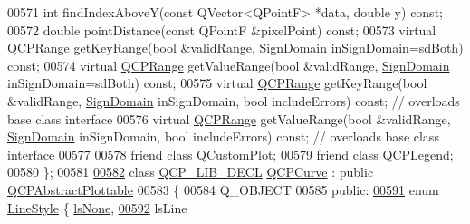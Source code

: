\begin{DoxyCode}
00571   \textcolor{keywordtype}{int} findIndexAboveY(\textcolor{keyword}{const} QVector<QPointF> *data, \textcolor{keywordtype}{double} y) \textcolor{keyword}{const};
00572   \textcolor{keywordtype}{double} pointDistance(\textcolor{keyword}{const} QPointF &pixelPoint) \textcolor{keyword}{const};
00573   \textcolor{keyword}{virtual} \hyperlink{a00049}{QCPRange} getKeyRange(\textcolor{keywordtype}{bool} &validRange, \hyperlink{a00024_a661743478a1d3c09d28ec2711d7653d8}{SignDomain} inSignDomain=sdBoth) \textcolor{keyword}{const};
00574   \textcolor{keyword}{virtual} \hyperlink{a00049}{QCPRange} getValueRange(\textcolor{keywordtype}{bool} &validRange, \hyperlink{a00024_a661743478a1d3c09d28ec2711d7653d8}{SignDomain} inSignDomain=sdBoth) \textcolor{keyword}{const};
00575   \textcolor{keyword}{virtual} \hyperlink{a00049}{QCPRange} getKeyRange(\textcolor{keywordtype}{bool} &validRange, \hyperlink{a00024_a661743478a1d3c09d28ec2711d7653d8}{SignDomain} inSignDomain, \textcolor{keywordtype}{bool} 
      includeErrors) \textcolor{keyword}{const}; \textcolor{comment}{// overloads base class interface}
00576   \textcolor{keyword}{virtual} \hyperlink{a00049}{QCPRange} getValueRange(\textcolor{keywordtype}{bool} &validRange, \hyperlink{a00024_a661743478a1d3c09d28ec2711d7653d8}{SignDomain} inSignDomain, \textcolor{keywordtype}{bool} 
      includeErrors) \textcolor{keyword}{const}; \textcolor{comment}{// overloads base class interface}
00577   
\hypertarget{a00116_source_l00578}{}\hyperlink{a00031_a1cdf9df76adcfae45261690aa0ca2198}{00578}   \textcolor{keyword}{friend} \textcolor{keyword}{class }QCustomPlot;
\hypertarget{a00116_source_l00579}{}\hyperlink{a00031_a8429035e7adfbd7f05805a6530ad5e3b}{00579}   \textcolor{keyword}{friend} \textcolor{keyword}{class }\hyperlink{a00045}{QCPLegend};
00580 \};
00581 
\hypertarget{a00116_source_l00582}{}\hyperlink{a00028}{00582} \textcolor{keyword}{class }\hyperlink{a00116_a5eaab02224a642ded7fb8951e973a02c}{QCP\_LIB\_DECL} \hyperlink{a00028}{QCPCurve} : \textcolor{keyword}{public} \hyperlink{a00024}{QCPAbstractPlottable}
00583 \{
00584   Q\_OBJECT
00585 \textcolor{keyword}{public}:
\hypertarget{a00116_source_l00591}{}\hyperlink{a00028_a2710e9f79302152cff794c6e16cc01f1aec1601a191cdf0b4e761c4c66092cc48}{00591}   \textcolor{keyword}{enum} \hyperlink{a00028_a2710e9f79302152cff794c6e16cc01f1}{LineStyle} \{ \hyperlink{a00028_a2710e9f79302152cff794c6e16cc01f1aec1601a191cdf0b4e761c4c66092cc48}{lsNone}, 
\hypertarget{a00116_source_l00592}{}\hyperlink{a00028_a2710e9f79302152cff794c6e16cc01f1ade5822ce6fbf131d3df131795c2e1003}{00592}                    lsLine  

\end{DoxyCode}
